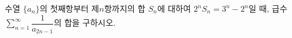 수열 $\{a_n\}$의 첫째항부터 제$n$항까지의 합 $S_n$에 대하여 $2^nS_n=3^n-2^n$일 때, 급수 $\displaystyle\sum_{n=1}^{\infty}\dfrac{1}{a_{2n-1}}$의 합을 구하시오.
